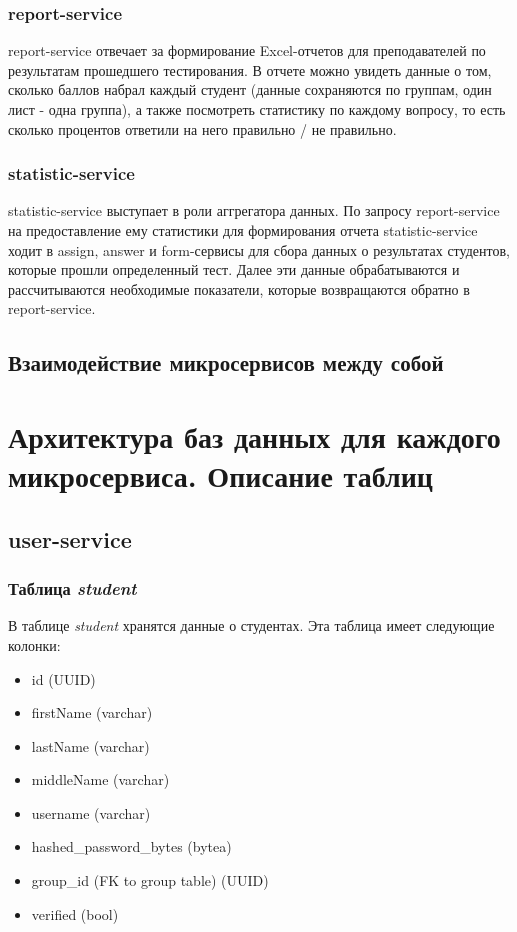 \documentclass[4paper,12pt]{article}
\begin{document}
	\subsubsection{report-service}
	report-service отвечает за формирование Excel-отчетов для преподавателей по результатам прошедшего тестирования. В отчете можно увидеть данные о том, сколько баллов набрал каждый студент (данные сохраняются по группам, один лист - одна группа), а также посмотреть статистику по каждому вопросу, то есть сколько процентов ответили на него правильно / не правильно.
	
	\subsubsection{statistic-service}
	statistic-service выступает в роли аггрегатора данных. По запросу report-service на предоставление ему статистики для формирования отчета statistic-service ходит в assign, answer и form-сервисы для сбора данных о результатах студентов, которые прошли определенный тест. Далее эти данные обрабатываются и рассчитываются необходимые показатели, которые возвращаются обратно в report-service.
	
	\subsection{Взаимодействие микросервисов между собой}	
	
	\section{Архитектура баз данных для каждого микросервиса. Описание таблиц}
	\subsection{user-service}
	\subsubsection{Таблица \textit{student}}
	В таблице \textit{student} хранятся данные о студентах. Эта таблица имеет следующие колонки:
	\begin{itemize}
		\item id (UUID)
		\item firstName (varchar)
		\item lastName (varchar)
		\item middleName (varchar)
		\item username (varchar)
		\item hashed\_password\_bytes (bytea)
		\item group\_id (FK to group table) (UUID)
		\item verified (bool)
	\end{itemize}
	
\end{document}
